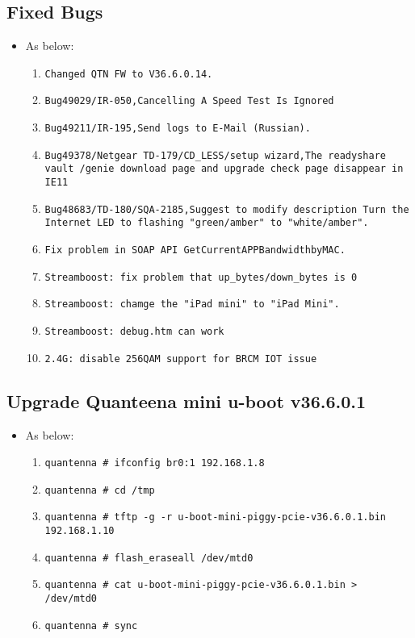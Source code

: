 \documentclass[12pt]{report}
\begin{document}
    \subsection{Fixed Bugs}
    \begin{itemize}
    \item As below:
    	\begin{enumerate}
		\item \texttt{Changed QTN FW to V36.6.0.14.}
		\item \texttt{Bug49029/IR-050,Cancelling A Speed Test Is Ignored}
		\item \texttt{Bug49211/IR-195,Send logs to E-Mail (Russian).}
		\item \texttt{Bug49378/Netgear TD-179/CD\_LESS/setup wizard,The readyshare vault /genie download page and upgrade check page disappear in IE11}
		\item \texttt{Bug48683/TD-180/SQA-2185,Suggest to modify description Turn the Internet LED to flashing "green/amber" to "white/amber".}
		\item \texttt{Fix problem in SOAP API GetCurrentAPPBandwidthbyMAC.}
		\item \texttt{Streamboost: fix problem that up\_bytes/down\_bytes is 0}
		\item \texttt{Streamboost: chamge the "iPad mini" to "iPad Mini".}
		\item \texttt{Streamboost: debug.htm can work}
		\item \texttt{2.4G: disable 256QAM support for BRCM IOT issue}

    	\end{enumerate}
    \end{itemize}

    \subsection{Upgrade Quanteena mini u-boot v36.6.0.1}
    \begin{itemize}
    \item As below:
    	\begin{enumerate}
		\item \texttt{quantenna \# ifconfig br0:1 192.168.1.8}
		\item \texttt{quantenna \# cd /tmp}
		\item \texttt{quantenna \# tftp -g -r u-boot-mini-piggy-pcie-v36.6.0.1.bin 192.168.1.10}
		\item \texttt{quantenna \# flash\_eraseall /dev/mtd0}
		\item \texttt{quantenna \# cat u-boot-mini-piggy-pcie-v36.6.0.1.bin > /dev/mtd0}
		\item \texttt{quantenna \# sync}
    	\end{enumerate}
    \end{itemize}
\end{document}
